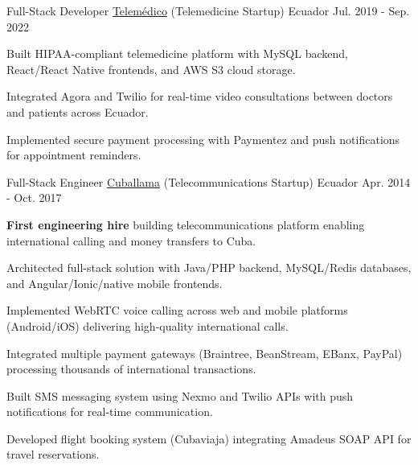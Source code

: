 \begin{cventries}
  \cventry
    {Full-Stack Developer} %
    {\href{https://telemedico.com.ec/}{Telemédico} (Telemedicine Startup)} %
    {Ecuador} %
    {Jul. 2019 - Sep. 2022} %
    {
      \begin{cvitems} %
        \item {Built HIPAA-compliant telemedicine platform with MySQL backend, React/React Native frontends, and AWS S3 cloud storage.}
        \item {Integrated Agora and Twilio for real-time video consultations between doctors and patients across Ecuador.}
        \item {Implemented secure payment processing with Paymentez and push notifications for appointment reminders.}
      \end{cvitems}
    }

  \cventry
    {Full-Stack Engineer} %
    {\href{https://www.cuballama.com/}{Cuballama} (Telecommunications Startup)} %
    {Ecuador} %
    {Apr. 2014 - Oct. 2017} %
    {
      \begin{cvitems} %
        \item {\textbf{First engineering hire} building telecommunications platform enabling international calling and money transfers to Cuba.}
        \item {Architected full-stack solution with Java/PHP backend, MySQL/Redis databases, and Angular/Ionic/native mobile frontends.}
        \item {Implemented WebRTC voice calling across web and mobile platforms (Android/iOS) delivering high-quality international calls.}
        \item {Integrated multiple payment gateways (Braintree, BeanStream, EBanx, PayPal) processing thousands of international transactions.}
        \item {Built SMS messaging system using Nexmo and Twilio APIs with push notifications for real-time communication.}
        \item {Developed flight booking system (Cubaviaja) integrating Amadeus SOAP API for travel reservations.}
      \end{cvitems}
    }

\end{cventries}
